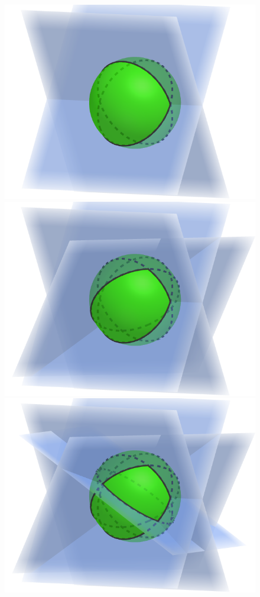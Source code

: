 \begin{frame}
\begin{columns}
\begin{figure}
\begin{overprint}
    \includegraphics[scale=0.3]{Images/gif/3.png}
    \includegraphics[scale=0.3]{Images/gif/4.png}
    \includegraphics[scale=0.3]{Images/gif/5.png}

\end{overprint}
\end{figure}
\end{columns}
\end{frame}
